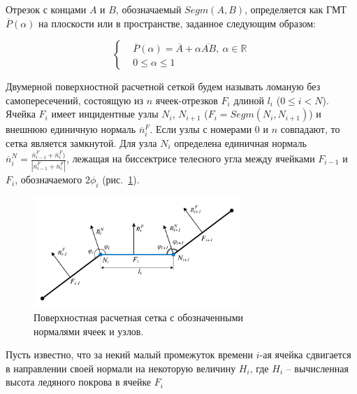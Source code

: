 Отрезок с концами $A$ и $B$, обозначаемый $Segm(A, B)$, определяется как ГМТ $\overline{P}(\alpha)$ на плоскости или в пространстве, заданное следующим образом:

\begin{equation}\label{eqn:text_1_geo_prim_segment}
	\left\{
		\begin{aligned}
			& \overline{P}(\alpha) = \overline{A} + \alpha \overline{AB}, \ \alpha \in \mathbb{R} \\
			& 0 \le \alpha \le 1
		\end{aligned}
	\right.
\end{equation}

\begin{definition}
Двумерной поверхностной расчетной сеткой будем называть ломаную без самопересечений, состоящую из $n$ ячеек-отрезков $F_i$ длиной $l_i$ ($0 \le i < N$).
Ячейка $F_i$ имеет инцидентные узлы $N_i$, $N_{i + 1}$ ($F_i = Segm(N_i, N_{i + 1})$) и внешнюю единичную нормаль $\overline{n}_i^F$.
Если узлы с номерами $0$ и $n$ совпадают, то сетка является замкнутой.
Для узла $N_i$ определена единичная нормаль $\overline{n}_i^N = \frac{\overline{n}_{i-1}^F + \overline{n}_i^F)}{|\overline{n}_{i-1}^F + \overline{n}_i^F|}$, лежащая на биссектрисе телесного угла между ячейками $F_{i - 1}$ и $F_i$, обозначаемого $2 \phi_i$ (рис.~\ref{fig:text_1_remesh_2d_grid_normals}).
\end{definition}

\begin{figure}[ht]
\centering
\includegraphics[width=0.7\textwidth]{fig/2dr_grid_normals.pdf}
\singlespacing
{}\caption{Поверхностная расчетная сетка с обозначенными \\ нормалями ячеек и узлов.}
\label{fig:text_1_remesh_2d_grid_normals}
\end{figure}

Пусть известно, что за некий малый промежуток времени $i$-ая ячейка сдвигается в направлении своей нормали на некоторую величину $H_i$, где $H_i$ -- вычисленная высота ледяного покрова в ячейке $F_i$

